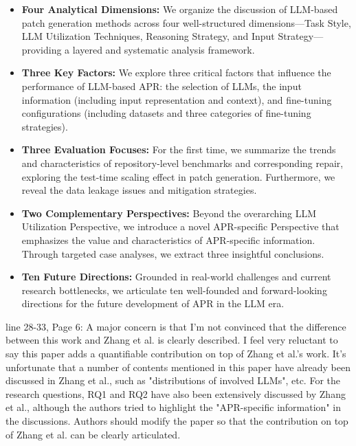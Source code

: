 \documentclass[acmsmall]{acmart}
\begin{document}
	\color{blue}
	\begin{itemize}
		\item \textbf{Four Analytical Dimensions:} We organize the discussion of LLM-based patch
			generation methods across four well-structured dimensions—Task Style, LLM Utilization Techniques,
			Reasoning Strategy, and Input Strategy—providing a layered and systematic analysis framework.

		\item \textbf{Three Key Factors:} We explore three critical factors that influence the
			performance of LLM-based APR: the selection of LLMs, the input information (including input
			representation and context), and fine-tuning configurations (including datasets and
			three categories of fine-tuning strategies).

		\item \textbf{Three Evaluation Focuses:} For the first time, we summarize the trends and characteristics
			of repository-level benchmarks and corresponding repair, exploring the test-time scaling
			effect in patch generation. Furthermore, we reveal the data leakage issues and
			mitigation strategies.

		\item \textbf{Two Complementary Perspectives:} Beyond the overarching LLM Utilization
			Perspective, we introduce a novel APR-specific Perspective that emphasizes the value and
			characteristics of APR-specific information. Through targeted case analyses, we extract three
			insightful conclusions.

		\item \textbf{Ten Future Directions:} Grounded in real-world challenges and current research
			bottlenecks, we articulate ten well-founded and forward-looking directions for the future
			development of APR in the LLM era.
	\end{itemize}
	\color{black}

	\begin{tcolorbox}
		[commentbox,title=Reviewer \#2 - Comment 3] line 28-33, Page 6: A major concern is that I'm
		not convinced that the difference between this work and Zhang et al. is clearly described. I
		feel very reluctant to say this paper adds a quantifiable contribution on top of Zhang et al.'s
		work. It's unfortunate that a number of contents mentioned in this paper have already been
		discussed in Zhang et al., such as "distributions of involved LLMs", etc. For the research
		questions, RQ1 and RQ2 have also been extensively discussed by Zhang et al., although the authors
		tried to highlight the "APR-specific information" in the discussions. Authors should modify
		the paper so that the contribution on top of Zhang et al. can be clearly articulated.
	\end{tcolorbox}
\end{document}
